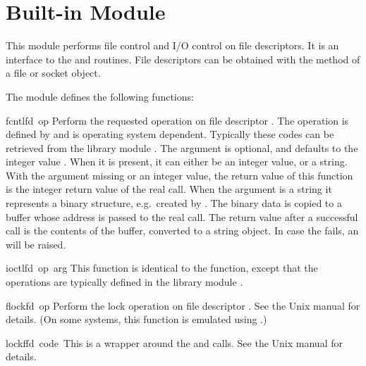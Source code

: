 \section{Built-in Module }

This module performs file control and I/O control on file descriptors.
It is an interface to the  and  \UNIX{} routines.
File descriptors can be obtained with the  method of a
file or socket object.

The module defines the following functions:

\renewcommand{\indexsubitem}{(in module struct)}

\begin{funcdesc}{fcntl}{fd\, op}
  Perform the requested operation on file descriptor .
  The operation is defined by  and is operating system
  dependent.  Typically these codes can be retrieved from the library
  module . The argument  is optional, and
  defaults to the integer value .  When
  it is present, it can either be an integer value, or a string.  With
  the argument missing or an integer value, the return value of this
  function is the integer return value of the real 
  call.  When the argument is a string it represents a binary
  structure, e.g.\ created by . The binary data is
  copied to a buffer whose address is passed to the real 
  call.  The return value after a successful call is the contents of
  the buffer, converted to a string object.  In case the
   fails, an  will be raised.
\end{funcdesc}

\begin{funcdesc}{ioctl}{fd\, op\, arg}
  This function is identical to the  function, except
  that the operations are typically defined in the library module
  .
\end{funcdesc}

\begin{funcdesc}{flock}{fd\, op}
Perform the lock operation  on file descriptor .
See the Unix manual for details.  (On some systems, this function is
emulated using .)
\end{funcdesc}

\begin{funcdesc}{lockf}{fd\, code\, }
This is a wrapper around the  and 
 calls.  See the Unix manual for details.
\end{funcdesc}

